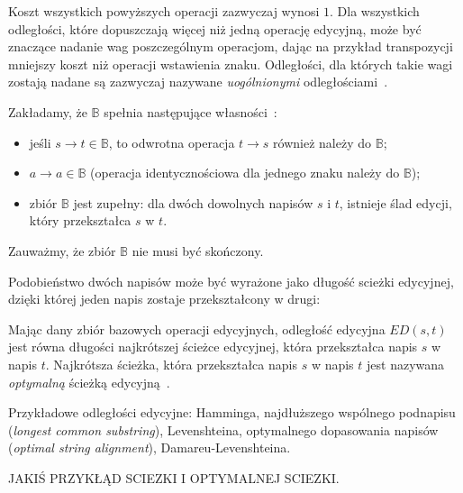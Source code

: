 \documentclass{praca1}
\begin{document}
Koszt wszystkich powyższych operacji zazwyczaj wynosi $1$. Dla wszystkich odległości, które dopuszczają więcej niż jedną operację edycyjną, może być znaczące nadanie wag poszczególnym operacjom, dając na przykład transpozycji mniejszy koszt niż operacji wstawienia znaku. Odległości, dla których takie wagi zostają nadane są zazwyczaj nazywane \emph{uogólnionymi} odległościami~\cite{Boytsov2011:indexingmethods}.

\begin{property}\label{wl:001}
Zakładamy, że $\mathbb{B}$ spełnia następujące własności~\cite{Boytsov2011:indexingmethods}:
\begin{itemize}
\item jeśli $s \rightarrow t \in \mathbb{B}$, to odwrotna operacja $t \rightarrow s$ również należy do $\mathbb{B}$;
\item $a \rightarrow a \in \mathbb{B}$ (operacja identycznościowa dla jednego znaku należy do $\mathbb{B}$);
\item zbiór $\mathbb{B}$ jest zupełny: dla dwóch dowolnych napisów $s$ i $t$, istnieje ślad edycji, który przekształca $s$ w $t$.
\end{itemize}
\end{property}

Zauważmy, że zbiór $\mathbb{B}$ nie musi być skończony.

Podobieństwo dwóch napisów może być wyrażone jako długość scieżki edycyjnej, dzięki której jeden napis zostaje przekształcony w drugi:

\begin{definition}
Mając dany zbiór bazowych operacji edycyjnych, odległość edycyjna $ED(s,t)$ jest równa długości najkrótszej ścieżce edycyjnej, która przekształca napis $s$ w napis $t$. Najkrótsza ścieżka, która przekształca napis $s$ w napis $t$ jest nazywana \emph{optymalną} ścieżką edycyjną~\cite{Boytsov2011:indexingmethods}. 
\end{definition}

Przykładowe odległości edycyjne: Hamminga, najdłuższego wspólnego podnapisu (\emph{longest common substring}), Levenshteina, optymalnego dopasowania napisów (\emph{optimal string alignment}), Damareu-Levenshteina. 

\begin{example}
JAKIŚ PRZYKŁĄD SCIEZKI I OPTYMALNEJ SCIEZKI.
\end{example}
\end{document}
